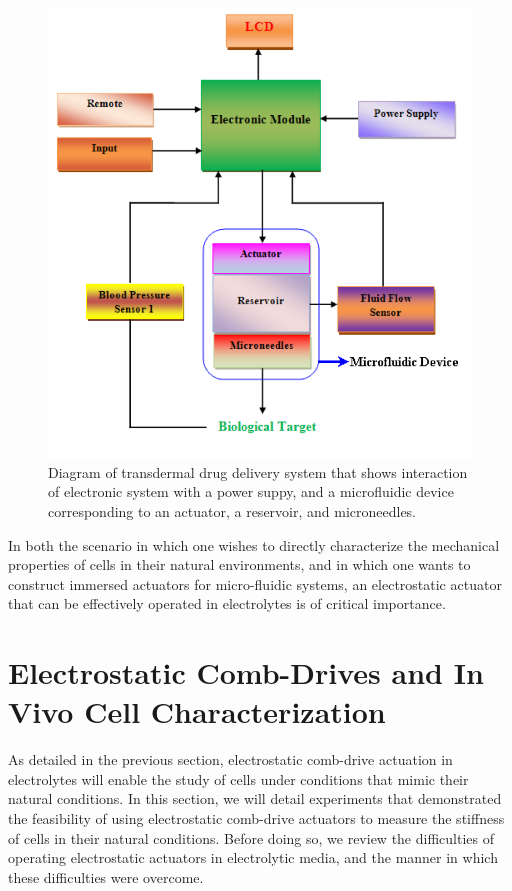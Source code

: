 \begin{figure}[htpb]
    \includegraphics[width=\linewidth]{Chapter2/Figs/Raster/TDD.png}
    \caption{Diagram of transdermal drug delivery system that shows interaction of electronic system with a power suppy, and a microfluidic device corresponding to an actuator, a reservoir, and microneedles.}\label{tdd}
\end{figure}

In both the scenario in which one wishes to directly characterize the mechanical properties of cells in their natural environments, and in which one wants to construct immersed actuators for micro-fluidic systems, an electrostatic actuator that can be effectively operated in electrolytes is of critical importance.

\section{Electrostatic Comb-Drives and In Vivo Cell Characterization}
As detailed in the previous section, electrostatic comb-drive actuation in electrolytes will enable the study of cells under conditions that mimic their natural conditions. In this section, we will detail experiments that demonstrated the feasibility of using electrostatic comb-drive actuators to measure the stiffness of cells in their natural conditions. Before doing so, we review the difficulties of operating electrostatic actuators in electrolytic media, and the manner in which these difficulties were overcome. 

